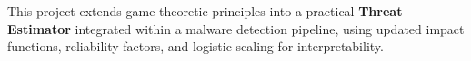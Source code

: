 \documentclass[12pt, a4paper]{report}
\begin{document}
This project extends game-theoretic principles into a practical
\textbf{Threat Estimator} integrated within a malware detection pipeline, using
updated impact functions, reliability factors, and logistic scaling for
interpretability.

\cleardoublepage






\end{document}
